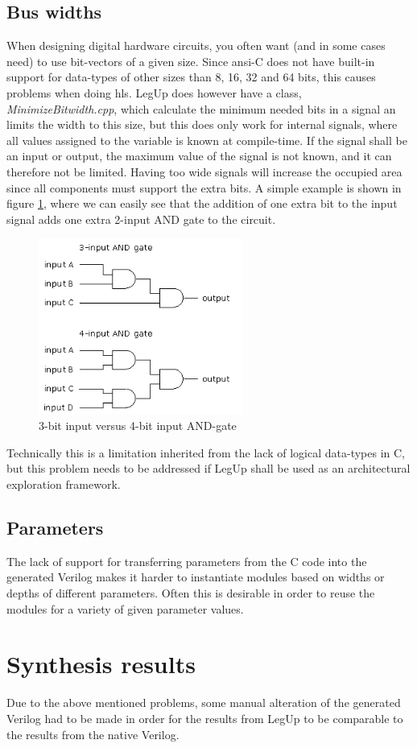 \subsection{Bus widths}
When designing digital hardware circuits, you often want (and in some cases need) to use bit-vectors of a given size. Since \gls{ansi}-C does not have built-in support for data-types of other sizes than 8, 16, 32 and 64 bits, this causes problems when doing \gls{hls}. LegUp does however have a class, \textit{MinimizeBitwidth.cpp}, which calculate the minimum needed bits in a signal an limits the width to this size, but this does only work for internal signals, where all values assigned to the variable is known at compile-time. If the signal shall be an input or output, the maximum value of the signal is not known, and it can therefore not be limited. Having too wide signals will increase the occupied area since all components must support the extra bits. A simple example is shown in figure \ref{fig:andgate34}, where we can easily see that the addition of one extra bit to the input signal adds one extra 2-input AND gate to the circuit.
\begin{figure}[hbpt]
\centering
\includegraphics[width=0.6\textwidth]{../figs/AndGate34Bit.png}
\caption{\label{fig:andgate34}3-bit input versus 4-bit input AND-gate}
\end{figure}
Technically this is a limitation inherited from the lack of logical data-types in C, but this problem needs to be addressed if LegUp shall be used as an architectural exploration framework.
\subsection{\label{subsec:parameterprobs}Parameters}
The lack of support for transferring parameters from the C code into the generated Verilog makes it harder to instantiate modules based on widths or depths of different parameters. Often this is desirable in order to reuse the modules for a variety of given parameter values.
\section{\label{sec:synthres}Synthesis results}
Due to the above mentioned problems, some manual alteration of the generated Verilog had to be made in order for the results from LegUp to be comparable to the results from the native Verilog.